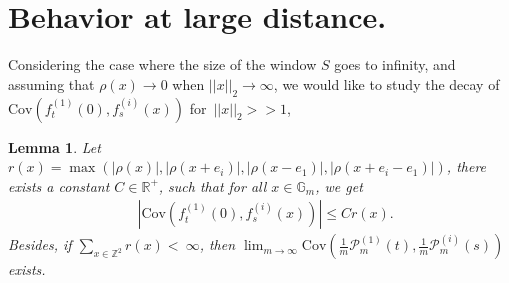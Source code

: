 \documentclass[12pt]{article}
\theoremstyle{Theorem}
\newtheorem{Lemma}[Theorem]{Lemma}
\theoremstyle{definition}
\begin{document}
\section{Behavior at large distance.}
Considering the case where the size of the window $S$ goes to infinity, and assuming that $\rho(x) \to 0$ when $||x||_{2} \to \infty$, we would like to study the decay of $\text{Cov}\left(f_{t}^{\scriptscriptstyle(1)}(0), f_{s}^{\scriptscriptstyle(i)}(x) \right)$ for~$||x||_{2} >> 1$,  
\begin{Lemma}
\label{lemmarx}
Let $r(x) = \max\left(|\rho(x)|, |\rho(x + e_i)|, |\rho(x-e_1)|, |\rho(x +e_i - e_1)| \right)$, there exists a constant $C \in \mathbb{R}^{+}$, such that for all $x \in \mathbb{G}_{m}$, we get
\begin{align*}
&  |\text{Cov}\left(f_{t}^{\scriptscriptstyle(1)}(0), f_{s}^{\scriptscriptstyle(i)}(x) \right)| \leq Cr(x). 
\end{align*}
Besides, if $\sum_{x \in \mathbb{Z}^{2}} r(x) <~\infty$, then 
$\lim_{m \to \infty}\text{Cov}\left(\frac{1}{m}\mathcal{P}_{m}^{\scriptscriptstyle (1)}(t), \frac{1}{m}\mathcal{P}_{m}^{\scriptscriptstyle (i)}(s) \right)$ exists. 
\end{Lemma}
\end{document}
